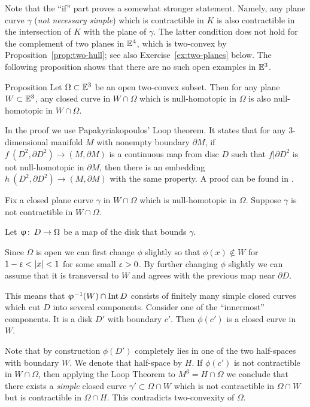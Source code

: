 Note that the ``if'' part proves a somewhat stronger statement.
Namely,  any plane curve $\gamma$ (\emph{not necessary simple}) which is  contractible in $K$ is also contractible in the intersection of $K$ with the plane of $\gamma$.
The latter condition does not hold for the complement 
of two planes in $\mathbb{E}^4$, which is two-convex by Proposition~\ref{prop:two-hull};
see also Exercise~\ref{ex:two-planes} below.
The following proposition shows that there are no such open examples in $\mathbb{E}^3$.

\begin{thm}{Proposition}\label{prop:3d-strong-2-convexity}
Let $\Omega\subset\EE^3$ be an open two-convex subset.
Then for any plane $W\subset\EE^3$, 
any closed curve in $W\cap \Omega$ 
which is null-homotopic in $\Omega$ is also null-homotopic in $W\cap \Omega$.
\end{thm}

In the proof we use Papakyriakopoulos' Loop theorem.
It states that for any 3-dimensional manifold $M$ with nonempty boundary $\partial M$, if 
$f\: (D^2,\partial D^2)\to (M,\partial M)$
is a continuous map from disc $D$ such that $f|\partial D^2$ is not null-homotopic in $\partial M$, then there is an embedding 
$h\: (D^2,\partial D^2)\to (M,\partial M)$ 
with the same property.
A proof can be found in \cite{hatcher}.

Fix a closed plane curve $\gamma$ in $W\cap \Omega$ which is null-homotopic in $\Omega$. Suppose $\gamma$ is not contractible in  $W\cap \Omega$.

Let $\phi\co D\to\Omega$ be a map of the disk that bounds $\gamma$.

Since $\Omega$ is open we can first change  $\phi$  slightly so that $\phi(x)\notin W$ for $1-\eps<|x|<1$ for some small $\upvarepsilon>0$.
By further changing $\phi$ slightly we can assume that it is transversal to $W$ and agrees with the previous map near $\partial D$.


This means that $\phi^{-1} (W)\cap \Int D$ consists of finitely many simple closed curves which cut $D$ into several components. 
Consider one of the ``innermost'' components. 
It is a disk $D'$ with boundary $c'$. 
Then  $\phi(c')$ is a closed curve in $W$. 

Note that by construction  $\phi(D')$  completely lies in one of the two half-spaces  with boundary $W$. 
We denote that half-space by $H$.
If $\phi(c')$ is not contractible in $W\cap \Omega$,  then applying the Loop Theorem to $M^3=H\cap \Omega$ we conclude that  there exists a \emph{simple} closed curve $\gamma'\subset \Omega\cap W$ which is not contractible in $\Omega\cap W$ but is contractible in $\Omega\cap H$. 
This contradicts two-convexity of $\Omega$. 

